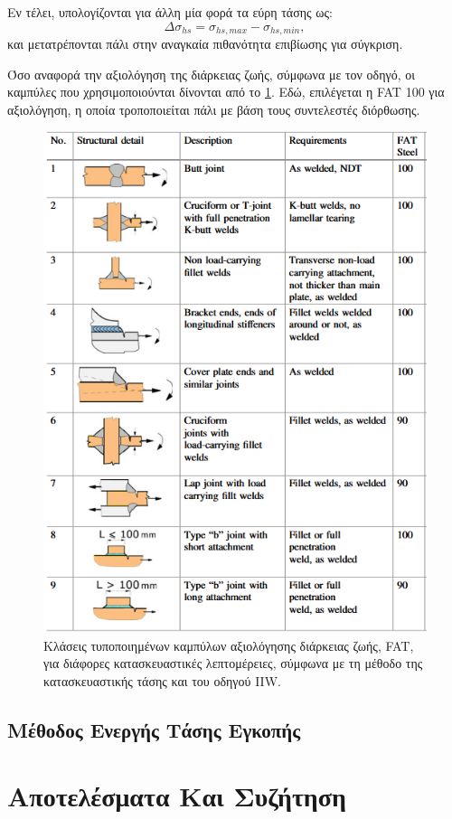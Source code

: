\documentclass{article}
\begin{document}
Εν τέλει, υπολογίζονται για άλλη μία φορά τα εύρη τάσης ως:
\begin{equation}
    \Delta \sigma_{hs} = \sigma_{hs,max} - \sigma_{hs,min},
\end{equation}
και μετατρέπονται πάλι στην αναγκαία πιθανότητα επιβίωσης για σύγκριση. 
\par Όσο αναφορά την αξιολόγηση της διάρκειας ζωής, σύμφωνα με τον οδηγό, οι καμπύλες που χρησιμοποιούνται δίνονται από το \ref{fig:faths}. Εδώ, επιλέγεται η FAT 100 για αξιολόγηση, η οποία τροποποιείται πάλι με βάση τους συντελεστές διόρθωσης.
\begin{figure}[H]
    \centering
    \includegraphics[width = 0.45\linewidth]{media/hsfat.png}
    \caption{Κλάσεις τυποποιημένων καμπύλων αξιολόγησης διάρκειας ζωής, FAT, για διάφορες κατασκευαστικές λεπτομέρειες, σύμφωνα με τη μέθοδο της κατασκευαστικής τάσης και του οδηγού IIW.}
    \label{fig:faths}
\end{figure}


\subsection{Μέθοδος Ενεργής Τάσης Εγκοπής}


\section{Αποτελέσματα Και Συζήτηση}

\listoffigures
\listoftables
\end{document}
